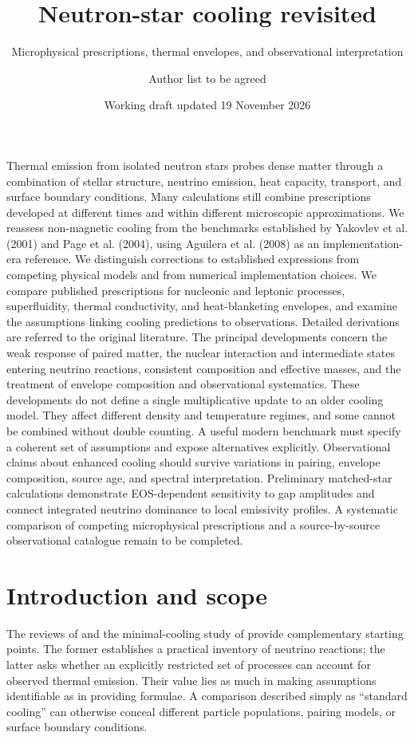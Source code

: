 \documentclass{aa}
\begin{document}
\raggedbottom
\title{Neutron-star cooling revisited}
\subtitle{Microphysical prescriptions, thermal envelopes, and observational interpretation}
\author{Author list to be agreed}
\date{Working draft updated 19 November 2026}
\abstract
{Thermal emission from isolated neutron stars probes dense matter through a combination of stellar structure, neutrino emission, heat capacity, transport, and surface boundary conditions. Many calculations still combine prescriptions developed at different times and within different microscopic approximations.}
{We reassess non-magnetic cooling from the benchmarks established by Yakovlev et al. (2001) and Page et al. (2004), using Aguilera et al. (2008) as an implementation-era reference. We distinguish corrections to established expressions from competing physical models and from numerical implementation choices.}
{We compare published prescriptions for nucleonic and leptonic processes, superfluidity, thermal conductivity, and heat-blanketing envelopes, and examine the assumptions linking cooling predictions to observations. Detailed derivations are referred to the original literature.}
{The principal developments concern the weak response of paired matter, the nuclear interaction and intermediate states entering neutrino reactions, consistent composition and effective masses, and the treatment of envelope composition and observational systematics. These developments do not define a single multiplicative update to an older cooling model. They affect different density and temperature regimes, and some cannot be combined without double counting.}
{A useful modern benchmark must specify a coherent set of assumptions and expose alternatives explicitly. Observational claims about enhanced cooling should survive variations in pairing, envelope composition, source age, and spectral interpretation. Preliminary matched-star calculations demonstrate EOS-dependent sensitivity to gap amplitudes and connect integrated neutrino dominance to local emissivity profiles. A systematic comparison of competing microphysical prescriptions and a source-by-source observational catalogue remain to be completed.}
\maketitle

\section{Introduction and scope}
The reviews of \citet{Yakovlev2001} and the minimal-cooling study of \citet{Page2004} provide complementary starting points. The former establishes a practical inventory of neutrino reactions; the latter asks whether an explicitly restricted set of processes can account for observed thermal emission. Their value lies as much in making assumptions identifiable as in providing formulae. A comparison described simply as ``standard cooling'' can otherwise conceal different particle populations, pairing models, or surface boundary conditions.
\end{document}
